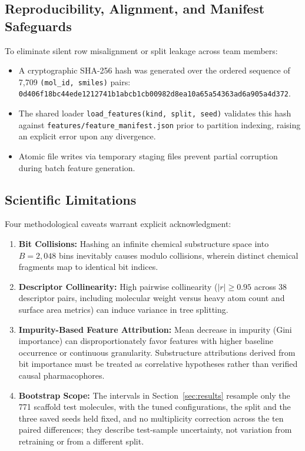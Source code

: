 \subsection{Reproducibility, Alignment, and Manifest Safeguards}
\label{subsec:safeguards}
To eliminate silent row misalignment or split leakage across team members:
\begin{itemize}
    \item A cryptographic SHA-256 hash was generated over the ordered sequence of 7,709 \texttt{(mol\_id, smiles)} pairs: \texttt{0d406f18bc44ede1212741b1abcb1cb00982d8ea10a65a54363ad6a905a4d372}.
    \item The shared loader \texttt{load\_features(kind, split, seed)} validates this hash against \texttt{features/feature\_manifest.json} prior to partition indexing, raising an explicit error upon any divergence.
    \item Atomic file writes via temporary staging files prevent partial corruption during batch feature generation.
\end{itemize}

\subsection{Scientific Limitations}
\label{subsec:limitations}
Four methodological caveats warrant explicit acknowledgment:
\begin{enumerate}
    \item \textbf{Bit Collisions:} Hashing an infinite chemical substructure space into $B = 2{,}048$ bins inevitably causes modulo collisions, wherein distinct chemical fragments map to identical bit indices.
    \item \textbf{Descriptor Collinearity:} High pairwise collinearity ($|r| \ge 0.95$ across 38 descriptor pairs, including molecular weight versus heavy atom count and surface area metrics) can induce variance in tree splitting.
    \item \textbf{Impurity-Based Feature Attribution:} Mean decrease in impurity (Gini importance) can disproportionately favor features with higher baseline occurrence or continuous granularity. Substructure attributions derived from bit importance must be treated as correlative hypotheses rather than verified causal pharmacophores.
    \item \textbf{Bootstrap Scope:} The intervals in Section~\ref{sec:results} resample only the 771 scaffold test molecules, with the tuned configurations, the split and the three saved seeds held fixed, and no multiplicity correction across the ten paired differences; they describe test-sample uncertainty, not variation from retraining or from a different split.
\end{enumerate}

